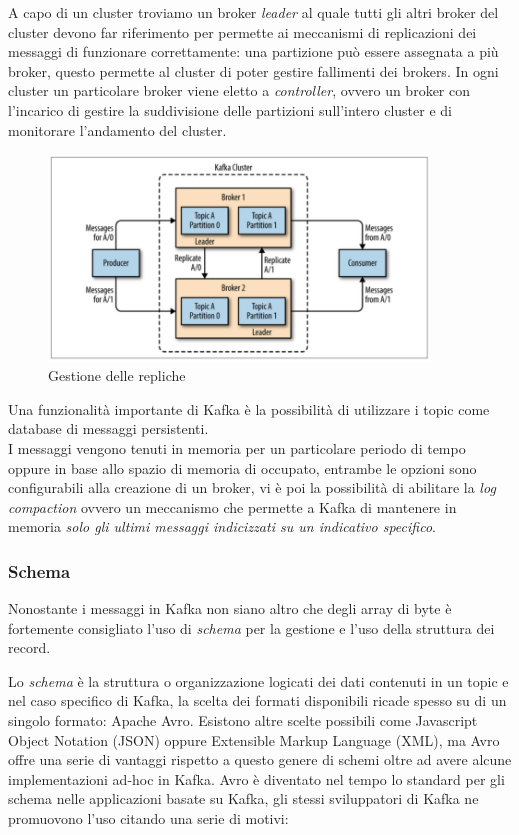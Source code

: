 \documentclass[]{article}
\begin{document}
A capo di un cluster troviamo un broker \emph{leader} al quale tutti gli
altri broker del cluster devono far riferimento per permette ai
meccanismi di replicazioni dei messaggi di funzionare correttamente: una
partizione può essere assegnata a più broker, questo permette al cluster
di poter gestire fallimenti dei brokers. In ogni cluster un particolare
broker viene eletto a \emph{controller}, ovvero un broker con l'incarico
di gestire la suddivisione delle partizioni sull'intero cluster e di
monitorare l'andamento del cluster.

\begin{figure}
\centering
\includegraphics[width=0.90000\textwidth]{../images/partition-replica.png}
\caption{Gestione delle repliche \label{figure_5}}
\end{figure}

Una funzionalità importante di Kafka è la possibilità di utilizzare i
topic come database di messaggi persistenti.\\
I messaggi vengono tenuti in memoria per un particolare periodo di tempo
oppure in base allo spazio di memoria di occupato, entrambe le opzioni
sono configurabili alla creazione di un broker, vi è poi la possibilità
di abilitare la \emph{log compaction} ovvero un meccanismo che permette
a Kafka di mantenere in memoria \emph{solo gli ultimi messaggi
indicizzati su un indicativo specifico}.

\newpage

\subsubsection{Schema}\label{schema}

Nonostante i messaggi in Kafka non siano altro che degli array di byte è
fortemente consigliato l'uso di \emph{schema} per la gestione e l'uso
della struttura dei record.

Lo \emph{schema} è la struttura o organizzazione logicati dei dati
contenuti in un topic e nel caso specifico di Kafka, la scelta dei
formati disponibili ricade spesso su di un singolo formato: Apache Avro.
Esistono altre scelte possibili come Javascript Object Notation (JSON)
oppure Extensible Markup Language (XML), ma Avro offre una serie di
vantaggi rispetto a questo genere di schemi oltre ad avere alcune
implementazioni ad-hoc in Kafka. Avro è diventato nel tempo lo standard
per gli schema nelle applicazioni basate su Kafka, gli stessi
sviluppatori di Kafka ne promuovono l'uso citando una serie di motivi:
\end{document}
